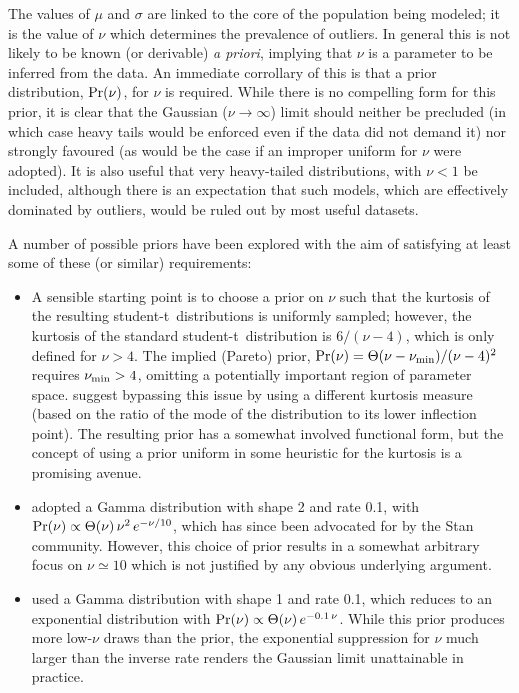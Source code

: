 \documentclass[a4paper,fleqn,usenatbib]{mnras}
\newcommand{\studentdist}{student-t}
\begin{document}
{The values of $\mu$ and $\sigma$ are linked to the core of the 
population being modeled; it is the value of $\nu$ which 
determines the prevalence of outliers. 
In general this is not likely to be known 
(or derivable) {\it a priori}, 
implying that $\nu$ 
is a parameter to be inferred from the data.
An immediate corrollary of this is that a prior distribution,
${\rm{Pr}}(\nu)$, for 
$\nu$ is required.
While there is no compelling form for this prior, 
it is clear that 
the Gaussian ($\nu \rightarrow \infty$) limit 
should neither be precluded
(in which case heavy tails would be enforced even if the data did
  not demand it)
nor strongly favoured
(as would be the case if an improper uniform for $\nu$ were adopted).
It is also useful that very heavy-tailed distributions,
with $\nu < 1$ be included, although there is an expectation that such 
models, which are effectively dominated by outliers,
would be ruled out by most useful datasets.

A number of possible priors have been explored with the aim of satisfying at least some of these (or similar) requirements:

\begin{itemize}

\item
A sensible starting point is to choose a prior on $\nu$ such that the kurtosis of the resulting \studentdist\ distributions is uniformly sampled; however, the kurtosis of the standard \studentdist\ distribution is $6/(\nu-4)$, which is only defined for $\nu > 4$. The implied (Pareto) prior, ${\rm{Pr}}(\nu) = \Theta(\nu - \nu_{\rm min}) / (\nu-4)^2$ requires $\nu_{\rm min} > 4$, omitting a potentially important region of parameter space. \cite{Rubio_Steel:2014} suggest bypassing this issue by using a different kurtosis measure (based on the ratio of the mode of the distribution to its lower inflection point). The resulting prior has a somewhat involved functional form, but the concept of using a prior uniform in some heuristic for the kurtosis is a promising avenue.

\item
\cite{Juarez_Steel:2010} adopted a Gamma distribution with shape 2 and rate 0.1, with ${\rm{Pr}}(\nu) \propto \Theta(\nu) \, \nu^2 \, e^{-\nu / 10}$, which has since been advocated for by the Stan community.  However, this choice of prior results in a somewhat arbitrary focus on $\nu \simeq 10$ which is not justified by any obvious underlying argument.

\item
\cite{Ding:2014} used a Gamma distribution with shape 1 and rate 0.1, which reduces to an exponential distribution with ${\rm{Pr}}(\nu) \propto \Theta(\nu) \, e^{-0.1 \,\nu}$. While this prior produces 
more low-$\nu$ draws than the \cite{Juarez_Steel:2010} prior, the exponential suppression for $\nu$ much larger than the inverse rate renders the Gaussian limit unattainable in practice.


\end{itemize}}
\end{document}
